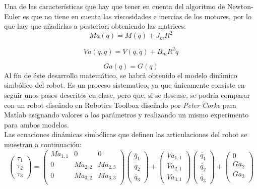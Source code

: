Una de las características que hay que tener en cuenta del algoritmo de Newton-Euler es que no tiene en cuenta las viscosidades e inercias de los motores, por lo que hay que añadirlas a posteriori obteniendo las matrices:
\begin{equation}
 Ma(q)=M(q)+J_mR^2
 \end{equation}

 \begin{equation}
 Va(q,\dot{q})=V(q,\dot{q})+B_mR^2\dot{q}
\end{equation}

\begin{equation}
  Ga(q)=G(q)
\end{equation}
Al fín de éste desarrollo matemático, se habrá obtenido el modelo dinámico simbólico del robot. Es un proceso sistematico, ya que únicamente consiste en seguir unos pasos descritos en clase, pero que, si se desease, se podría comparar con un robot diseñado en Robotics Toolbox diseñado por \textit{Peter Corke} para Matlab asignando valores a los parámetros y realizando un mismo experimento para ambos modelos.\\

Las ecuaciones dinámicas simbólicas que definen las articulaciones del robot se muestran a continuación: \\
\[
	\begin{pmatrix}
	\tau_{1} \\
	\tau_{2} \\
	\tau_{3}
	\end{pmatrix} =
	\begin{pmatrix}
		Ma_{1,1} & 0 & 0\\
		0 & Ma_{2,2} & Ma_{2,3}\\
		0 & Ma_{3,2} & Ma_{3,3}\\
	\end{pmatrix}
	\begin{pmatrix}
	\ddot{q_{1}} \\
	\ddot{q_{2}}  \\
	\ddot{q_{3}}
\end{pmatrix} +
\begin{pmatrix}
	Va_{1,1}\\
	Va_{2,1} \\
  Va_{3,1}
\end{pmatrix}
\begin{pmatrix}
		\dot{q_{1}} \\
		\dot{q_{2}}  \\
		\dot{q_{3}}
\end{pmatrix} +
\begin{pmatrix}
	0\\
	Ga_{2}\\
	Ga_{3}\\
\end{pmatrix}
\]

